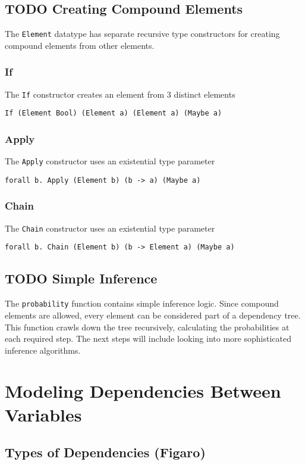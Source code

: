 \documentclass[11pt]{article}
\begin{document}
\subsection{{\bfseries\sffamily TODO} Creating Compound Elements}
\label{sec-1-6}
The \texttt{Element} datatype has separate recursive type constructors for creating
 compound elements from other elements.
\subsubsection{If}
\label{sec-1-6-1}
The \texttt{If} constructor creates an element from 3 distinct elements
\begin{center}
\texttt{If (Element Bool) (Element a) (Element a) (Maybe a)}
\end{center}
\subsubsection{Apply}
\label{sec-1-6-2}
The \texttt{Apply} constructor uses an existential type parameter
\begin{center}
\texttt{forall b. Apply (Element b) (b -> a) (Maybe a)}
\end{center}
\subsubsection{Chain}
\label{sec-1-6-3}
The \texttt{Chain} constructor uses an existential type parameter
\begin{center}
\texttt{forall b. Chain (Element b) (b -> Element a) (Maybe a)}
\end{center}



\subsection{{\bfseries\sffamily TODO} Simple Inference}
\label{sec-1-7}
The \texttt{probability} function contains simple inference logic. Since
compound elements are allowed, every element can be considered part of
a dependency tree. This function crawls down the tree recursively, calculating
the probabilities at each required step. The next steps will include looking
into more sophisticated inference algorithms.

\section{Modeling Dependencies Between Variables}
\label{sec-2}
\subsection{Types of Dependencies (Figaro)}
\label{sec-2-1}
\end{document}
